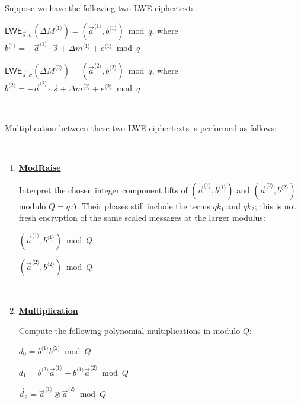 \begin{tcolorbox}[title={\textbf{\tboxlabel{\ref*{subsubsec:bfv-mult-cipher-tfhe}} Leveled LWE Tensor Multiplication}}]


Suppose we have the following two LWE ciphertexts:

$\textsf{LWE}_{\vec{s}, \sigma}(\Delta M^{\langle 1 \rangle}) = (\vec{a}^{\langle 1 \rangle}, b^{\langle 1 \rangle}) \bmod q$, \text{ } where $b^{\langle 1 \rangle} = -\vec{a}^{\langle 1 \rangle} \cdot \vec{s} + \Delta m^{\langle 1 \rangle} + e^{\langle 1 \rangle} \bmod q$

$\textsf{LWE}_{\vec{s}, \sigma}(\Delta M^{\langle 2 \rangle}) = (\vec{a}^{\langle 2 \rangle}, b^{\langle 2 \rangle}) \bmod q$, \text{ } where $b^{\langle 2 \rangle} = -\vec{a}^{\langle 2 \rangle} \cdot \vec{s} + \Delta m^{\langle 2 \rangle} + e^{\langle 2 \rangle} \bmod q$

$ $

Multiplication between these two LWE ciphertexts is performed as follows:

$ $

\begin{enumerate}

\item \textbf{\underline{\textsf{ModRaise}}}

Interpret the chosen integer component lifts of $(\vec{a}^{\langle 1 \rangle}, b^{\langle 1 \rangle})$ and $(\vec{a}^{\langle 2 \rangle}, b^{\langle 2 \rangle})$ modulo $Q=q\Delta$. Their phases still include the terms $qk_1$ and $qk_2$; this is not fresh encryption of the same scaled messages at the larger modulus:

$(\vec{a}^{\langle 1 \rangle}, b^{\langle 1 \rangle}) \bmod Q$

$(\vec{a}^{\langle 2 \rangle}, b^{\langle 2 \rangle}) \bmod Q$


$ $

\item \textbf{\underline{Multiplication}}

Compute the following polynomial multiplications in modulo $Q$: 

$d_0 = b^{\langle 1 \rangle}b^{\langle 2 \rangle} \bmod Q$

$d_1 = b^{\langle 2 \rangle}\vec{a}^{\langle 1 \rangle} +  b^{\langle 1 \rangle}\vec{a}^{\langle 2 \rangle} \bmod Q$

$\vec{d}_2 = \vec{a}^{\langle 1 \rangle} \otimes \vec{a}^{\langle 2 \rangle} \bmod Q$


$ $


\end{enumerate}
\end{tcolorbox}
